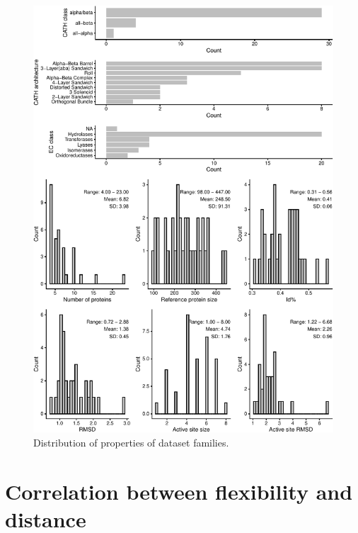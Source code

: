 \documentclass[
]{article}
\begin{document}
\clearpage

\begin{figure}

{\centering \includegraphics{supplementary_material_files/figure-latex/load_data_and_create_plot-1} 

}

\caption{Distribution of properties of dataset families.}\label{fig:load_data_and_create_plot}
\end{figure}

\clearpage

\clearpage

\hypertarget{correlation-between-flexibility-and-distance}{%
\section{Correlation between flexibility and
distance}\label{correlation-between-flexibility-and-distance}}
\end{document}
